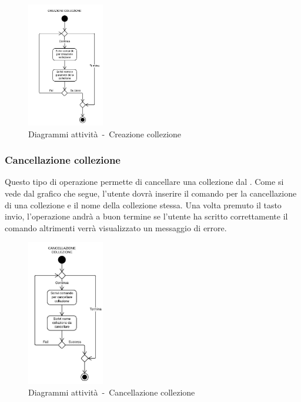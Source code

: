 \documentclass{scalatekids-article}
\begin{document}
\begin{figure}[H]
  \begin{center}
    \includegraphics[width=0.3\textwidth, keepaspectratio]{img/diagrammiAttivita/creazioneCollezione.jpeg}
    \caption{Diagrammi attività\ -\ Creazione collezione}
  \end{center}
\end{figure}

\subsubsection{Cancellazione collezione}

Questo tipo di operazione permette di cancellare una collezione dal .
Come si vede dal grafico che segue, l'utente dovrà inserire il comando per la
cancellazione di una collezione e il nome della collezione stessa. Una volta
premuto il tasto invio, l'operazione andrà a buon termine se l'utente ha
scritto correttamente il comando altrimenti verrà visualizzato un messaggio di
errore.

\begin{figure}[H]
  \begin{center}
    \includegraphics[width=0.3\textwidth, keepaspectratio]{img/diagrammiAttivita/cancCollezione.jpeg}
    \caption{Diagrammi attività\ -\ Cancellazione collezione}
  \end{center}
\end{figure}
\end{document}
